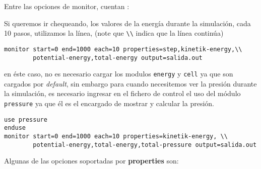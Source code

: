 Entre las opciones de monitor, cuentan :


Si queremos ir chequeando, los valores de la energ\'ia durante la simulaci\'on, cada 10 pasos, utilizamos la l\'inea, (note que \verb|\\| indica que la l\'inea contin\'ua)

\begin{verbatim}
monitor start=0 end=1000 each=10 properties=step,kinetik-energy,\\
        potential-energy,total-energy output=salida.out
\end{verbatim}

en \'este caso, no es necesario cargar los modulos \verb|energy| y \verb|cell| ya que son cargados por \textit{default}, sin embargo para cuando necesitemos ver la presi\'on durante la simulaci\'on, es necesario ingresar en el fichero de control el uso del m\'odulo \verb|pressure| ya que \'el es el encargado de mostrar y calcular la presi\'on.

\begin{verbatim}
use pressure
enduse
monitor start=0 end=1000 each=10 properties=kinetik-energy, \\
        potential-energy,total-energy,total-pressure output=salida.out
\end{verbatim}

Algunas de las opciones soportadas por \textbf{properties} son:

